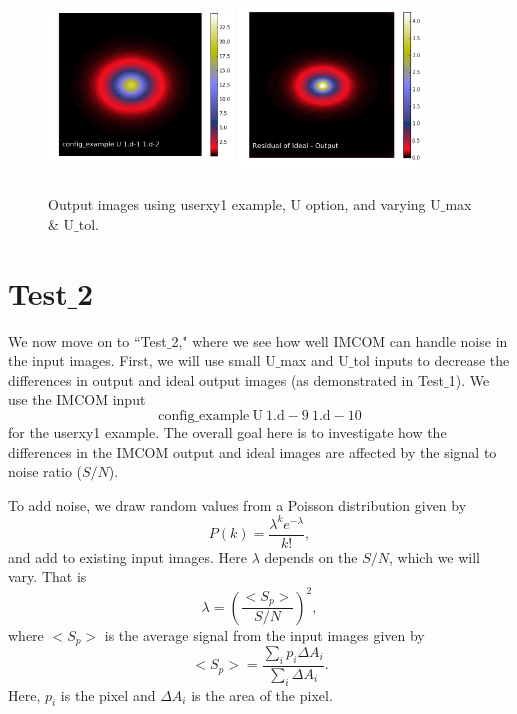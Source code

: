 \documentclass[12pt,preprint]{aastex6}
\begin{document}
\begin{figure}[!htbp]
\includegraphics[height=47mm,width=49mm]{f3p.png}
\includegraphics[height=47mm,width=49mm]{f3q.png}
\caption{Output images using userxy1 example, U option, and varying U${\_}$max \& U${\_}$tol.}
\label{fig:vary_umax_utol}
\end{figure}
  




\section{Test${\_}$2}
We now move on to ``Test${\_}$2," where we see how well IMCOM can handle noise in the input images. First, we will use small U${\_}$max and U${\_}$tol inputs to decrease the differences in output and ideal output images (as demonstrated in Test${\_}$1). We use the IMCOM input
\begin{equation}
\mathrm{config{\_}example \ U \ 1.d-9 \ 1.d-10}
\end{equation}
for the userxy1 example. The overall goal here is to investigate how the differences in the IMCOM output and ideal images are affected by the signal to noise ratio ($S/N$). 


To add noise, we draw random values from a Poisson distribution given by
\begin{equation}
P(k)=\frac{\lambda^{k}e^{-\lambda}}{k!},
\label{Eq:poisson}
\end{equation}
and add to existing input images. Here $\lambda$ depends on the $S/N$, which we will vary. That is
\begin{equation}
\lambda=\left(\frac{<S_{p}>}{S/N}\right)^2,
\label{Eq:lambda}
\end{equation}
where $<S_{p}>$ is the average signal from the input images given by
\begin{equation}
<S_{p}>=\frac{\sum_{i}p_{i}\Delta A_{i}}{\sum_{i}\Delta A_{i}}.
\label{Eq:avg_sig}
\end{equation}
Here, $p_{i}$ is the pixel and $\Delta A_{i}$ is the area of the pixel. 
\end{document}
